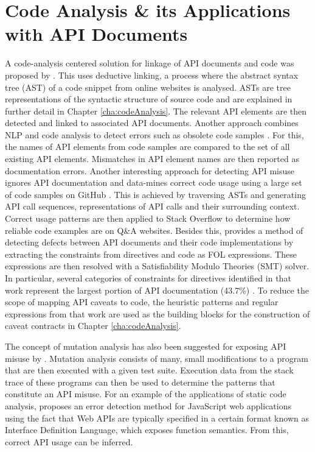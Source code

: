 \section{Code Analysis \& its Applications with API Documents}
\label{sec:related-static-code-analysis}
A code-analysis centered solution for linkage of API documents and code was proposed by \cite{live-api-doc}. This uses deductive linking, a process where the abstract syntax tree (AST) of a code snippet from online websites is analysed. ASTs are tree representations of the syntactic structure of source code and are explained in further detail in Chapter \ref{cha:codeAnalysis}. The relevant API elements are then detected and linked to associated API documents. Another approach combines NLP and code analysis to detect errors such as obsolete code samples \cite{zhong2013detecting}. For this, the names of API elements from code samples are compared to the set of all existing API elements. Mismatches in API element names are then reported as documentation errors. Another interesting approach for detecting API misuse ignores API documentation and data-mines correct code usage using a large set of code samples on GitHub \cite{code-examples}. This is achieved by traversing ASTs and generating API call sequences, representations of API calls and their surrounding context. Correct usage patterns are then applied to Stack Overflow to determine how reliable code examples are on Q\&A websites. Besides this, \cite{zhou-directive} provides a method of detecting defects between API documents and their code implementations by extracting the constraints from directives and code as FOL expressions. These expressions are then resolved with a Satisfiability Modulo Theories (SMT) solver. In particular, several categories of constraints for directives identified in that work represent the largest portion of API documentation (43.7\%) \cite{monperrus2012should}. To reduce the scope of mapping API caveats to code, the heuristic patterns and regular expressions from that work are used as the building blocks for the construction of caveat contracts in Chapter \ref{cha:codeAnalysis}. \bigbreak

The concept of mutation analysis has also been suggested for exposing API misuse by \cite{mutation-analysis}. Mutation analysis consists of many, small modifications to a program that are then executed with a given test suite. Execution data from the stack trace of these programs can then be used to determine the patterns that constitute an API misuse. For an example of the applications of static code analysis, \cite{bae2014safewapi} proposes an error detection method for JavaScript web applications using the fact that Web APIs are typically specified in a certain format known as Interface Definition Language, which exposes function semantics. From this, correct API usage can be inferred.

